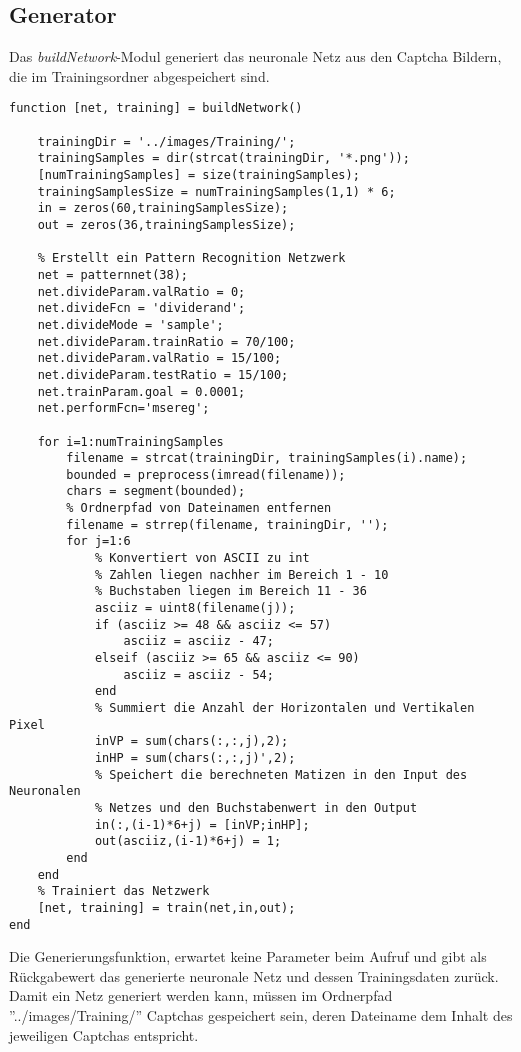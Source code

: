 \subsection{Generator}
Das \textit{buildNetwork}-Modul generiert das neuronale Netz aus den Captcha Bildern, die im Trainingsordner abgespeichert sind.
\begin{lstlisting}
function [net, training] = buildNetwork()

    trainingDir = '../images/Training/';
    trainingSamples = dir(strcat(trainingDir, '*.png'));
    [numTrainingSamples] = size(trainingSamples);
    trainingSamplesSize = numTrainingSamples(1,1) * 6;
    in = zeros(60,trainingSamplesSize);
    out = zeros(36,trainingSamplesSize);
    
    % Erstellt ein Pattern Recognition Netzwerk
    net = patternnet(38);
    net.divideParam.valRatio = 0;
    net.divideFcn = 'dividerand';
    net.divideMode = 'sample';
    net.divideParam.trainRatio = 70/100;
    net.divideParam.valRatio = 15/100;
    net.divideParam.testRatio = 15/100;
    net.trainParam.goal = 0.0001;
    net.performFcn='msereg'; 
  
    for i=1:numTrainingSamples
        filename = strcat(trainingDir, trainingSamples(i).name);  
        bounded = preprocess(imread(filename));     
        chars = segment(bounded);
        % Ordnerpfad von Dateinamen entfernen
        filename = strrep(filename, trainingDir, '');
        for j=1:6
            % Konvertiert von ASCII zu int 
            % Zahlen liegen nachher im Bereich 1 - 10
            % Buchstaben liegen im Bereich 11 - 36
            asciiz = uint8(filename(j));
            if (asciiz >= 48 && asciiz <= 57)
                asciiz = asciiz - 47;
            elseif (asciiz >= 65 && asciiz <= 90)
                asciiz = asciiz - 54;
            end
            % Summiert die Anzahl der Horizontalen und Vertikalen Pixel
            inVP = sum(chars(:,:,j),2);
            inHP = sum(chars(:,:,j)',2);
            % Speichert die berechneten Matizen in den Input des Neuronalen
            % Netzes und den Buchstabenwert in den Output
            in(:,(i-1)*6+j) = [inVP;inHP];
            out(asciiz,(i-1)*6+j) = 1;
        end
    end
    % Trainiert das Netzwerk
    [net, training] = train(net,in,out);       
end
\end{lstlisting}
Die Generierungsfunktion, erwartet keine Parameter beim Aufruf und gibt als Rückgabewert das generierte neuronale Netz und dessen Trainingsdaten zurück.\\
Damit ein Netz generiert werden kann, müssen im Ordnerpfad ''../images/Training/'' Captchas gespeichert sein, deren Dateiname dem Inhalt des jeweiligen Captchas entspricht.\\
